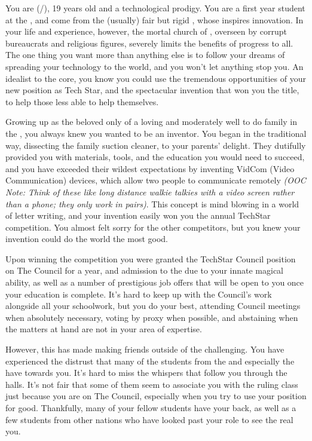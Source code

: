 \documentclass[char]{GL2020}
\begin{document}
\name{\cTechStar{}}

You are \cTechStar{\full} (\cTechStar{\they}/\cTechStar{\them}), 19 years old and a technological prodigy. You are a first year student at the \pSchool{}, and come from the (usually) fair but rigid \pTech{}, whose \cTechGod{\Deity} \cTechGod{} inspires innovation. In your life and experience, however, the mortal church of \cTechGod{}, overseen by corrupt bureaucrats and religious figures, severely limits the benefits of progress to all. The one thing you want more than anything else is to follow your dreams of spreading your technology to the world, and you won't let anything stop you. An idealist to the core, you know you could use the tremendous opportunities of your new position as Tech Star, and the spectacular invention that won you the title, to help those less able to help themselves.

Growing up as the beloved only \cTechStar{\offspring} of a loving and moderately well to do family in the \pTech{}, you always knew you wanted to be an inventor. You began in the traditional way, dissecting the family suction cleaner, to your parents' delight. They dutifully provided you with materials, tools, and the education you would need to succeed, and you have exceeded their wildest expectations by inventing VidCom (Video Communication) devices, which allow two people to communicate remotely \emph{(OOC Note: Think of these like long distance walkie talkies with a video screen rather than a phone; they only work in pairs)}. This concept is mind blowing in a world of letter writing, and your invention easily won you the annual TechStar competition. You almost felt sorry for the other competitors, but you knew your invention could do the world the most good.  

Upon winning the competition you were granted the TechStar Council position on The Council for a year, and admission to the \pSchool{} due to your innate magical ability, as well as a number of prestigious job offers that will be open to you once your education is complete. It's hard to keep up with the Council's work alongside all your schoolwork, but you do your best, attending Council meetings when absolutely necessary, voting by proxy when possible, and abstaining when the matters at hand are not in your area of expertise.

However, this has made making friends outside of the \pTech{} challenging. You have experienced the distrust that many of the students from the \pFarm{} and especially the \pShip{} have towards you. It’s hard to miss the whispers that follow you through the halls. It’s not fair that some of them seem to associate you with the ruling class just because you are on The Council, especially when you try to use your position for good. Thankfully, many of your fellow \pTech{} students have your back, as well as a few students from other nations who have looked past your role to see the real you.
\end{document}
